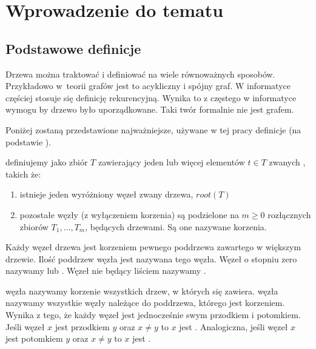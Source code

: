\chapter{Wprowadzenie do tematu}



\section{Podstawowe definicje}

Drzewa można traktować i definiować na wiele równoważnych sposobów.
Przykładowo w~teorii grafów jest to acykliczny i spójny graf.
W informatyce częściej stosuje się definicję rekurencyjną.
Wynika to z częstego w informatyce wymogu by drzewo było uporządkowane.
Taki twór formalnie nie jest grafem.


Poniżej zostaną przedstawione najważniejsze, używane w tej pracy definicje (na podstawie \cite{knuth}).


  definiujemy jako zbiór $T$ zawierający jeden lub więcej elementów $t \in T$ zwanych  , takich że:

\begin{enumerate}
 \item
    istnieje jeden wyróżniony węzeł zwany  drzewa, $root(T)$
 \item
    pozostałe węzły (z wyłączeniem korzenia) są podzielone na $m \geq 0$ rozłącznych zbiorów $T_{1},\ldots, T_{m}$,
	będących drzewami. Są one nazywane   korzenia.
\end{enumerate}

Każdy węzeł drzewa jest korzeniem pewnego poddrzewa zawartego w większym drzewie.
Ilość poddrzew węzła jest nazywana   tego węzła.
Węzeł o stopniu zero nazywamy   lub  . 
Węzeł nie będący liściem nazywamy  .



  węzła  nazywamy korzenie wszystkich drzew, w których się zawiera.
  węzła  nazywamy wszystkie węzły należące do poddrzewa, którego jest korzeniem. 
Wynika z tego, że każdy węzeł jest jednocześnie swym przodkiem i potomkiem.
Jeśli węzeł $x$ jest przodkiem $y$ oraz $x \neq y$ to $x$ jest .
Analogiczna, jeśli węzeł $x$ jest potomkiem $y$ oraz $x \neq y$ to $x$ jest .

